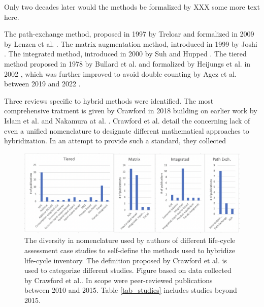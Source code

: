 \documentclass{article}
\begin{document}
        Only two decades later would the methods be formalized by XXX some more text here.
        
        The path-exchange method, proposed in 1997 by Treloar \cite{treloar_extracting_1997} and formalized in 2009 by Lenzen et al. \cite{lenzen_path_2009}. The matrix augmentation method, introduced in 1999 by Joshi \cite{joshi_product_1999}. The integrated method, introduced in 2000 by Suh and Hupped \cite{suh_gearing_2000}. The tiered method proposed in 1978 by Bullard et al. \cite{bullard_net_1978} and formalized by \cite{heij} Heijungs et al. in 2002 \cite{heijungs_computational_2002}, which was further improved to avoid double counting by Agez et al. between 2019 and 2022 \cite{agez_lifting_2019}\cite{agez_hybridization_2020}\cite{agez_correcting_2022}.

        Three reviews specific to hybrid methods were identified. The most comprehensive tratment is given by Crawford in 2018 \cite{crawford_hybrid_2018} building on earlier work by Islam et al. \cite{islam_review_2016} and Nakamura at al. \cite{nakamura_inputoutput_2016}. Crawford et al. detail the concerning lack of even a unified nomenclature to designate different mathematical approaches to hybridization. In an attempt to provide such a standard, they collected 
        
        \begin{figure}[h!]
        	\centering
        	\includegraphics[width=\textwidth]{figures/nomenclature.png}
        	\caption{The diversity in nomenclature used by authors of different life-cycle assessment case studies to self-define the methods used to hybridize life-cycle inventory. The definition proposed by Crawford et al. is used to categorize different studies. Figure based on data collected by Crawford et al.\cite{crawford_hybrid_2018}. In scope were peer-reviewed publications between 2010 and 2015. Table \ref{tab_studies} includes studies beyond 2015.}
        	\label{fig:performance}
        \end{figure}
        
\end{document}
